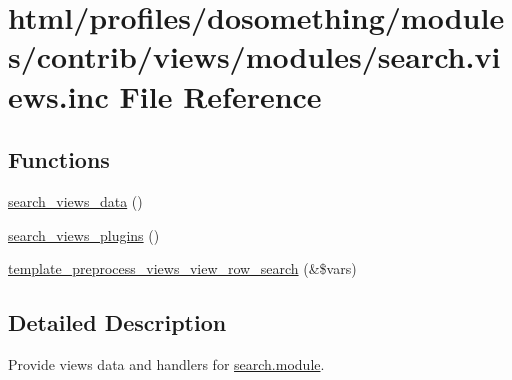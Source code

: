 \hypertarget{search_8views_8inc}{
\section{html/profiles/dosomething/modules/contrib/views/modules/search.views.inc File Reference}
\label{search_8views_8inc}
}
\subsection*{Functions}
\begin{DoxyCompactItemize}
\item 
\hyperlink{search_8views_8inc_ad91fdcb8037644087387a30d3a5719ee}{search\_\-views\_\-data} ()
\item 
\hyperlink{search_8views_8inc_aef27a11e726ee0039e3ffeed38562df3}{search\_\-views\_\-plugins} ()
\item 
\hyperlink{search_8views_8inc_ad2005db0a4841d084cadac887649bf6f}{template\_\-preprocess\_\-views\_\-view\_\-row\_\-search} (\&\$vars)
\end{DoxyCompactItemize}


\subsection{Detailed Description}
Provide views data and handlers for \hyperlink{search_8module}{search.module}. 

